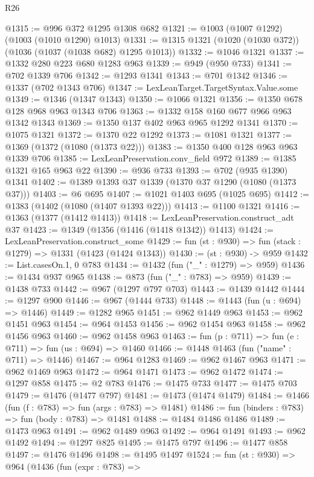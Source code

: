 \begin{lexlean}{R26}
\begin{coremodule}
@1315 := @996 @372 @1295 @1308 @682
@1321 := @1003 (@1007 @1292) (@1003 (@1010 @1290) @1013)
@1331 := @1315 @1321 (@1020 (@1030 @372)) (@1036 (@1037 (@1038 @682) @1295 @1013))
@1332 := @1046 @1321
@1337 := @1332 @280 @223 @680 @1283 @963
@1339 := @949 (@950 @733)
@1341 := @702 @1339 @706
@1342 := @1293 @1341
@1343 := @701 @1342
@1346 := @1337 (@702 @1343 @706)
@1347 := LexLeanTarget.TargetSyntax.Value.some
@1349 := @1346 (@1347 @1343)
@1350 := @1066 @1321
@1356 := @1350 @678 @128 @968 @963 @1343 @706
@1363 := @1332 @158 @160 @677 @966 @963 @1342 @1343
@1369 := @1350 @137 @402 @963 @965 @1292 @1341
@1370 := @1075 @1321
@1372 := @1370 @22 @1292
@1373 := @1081 @1321
@1377 := @1369 (@1372 (@1080 (@1373 @22)))
@1383 := @1350 @400 @128 @963 @963 @1339 @706
@1385 := LexLeanPreservation.conv_field @972
@1389 := @1385 @1321 @165 @963 @22
@1390 := @936 @733
@1393 := @702 (@935 @1390) @1341
@1402 := @1389 @1393 @37 @1339 (@1370 @37 @1290 (@1080 (@1373 @37)))
@1403 := @6 @695
@1407 := @1021 @1403 @695 (@1025 @695)
@1412 := @1383 (@1402 (@1080 (@1407 @1393 @22)))
@1413 := @1100 @1321
@1416 := @1363 (@1377 (@1412 @1413))
@1418 := LexLeanPreservation.construct_adt @37
@1423 := @1349 (@1356 (@1416 (@1418 @1342)) @1413)
@1424 := LexLeanPreservation.construct_some
@1429 := fun (st : @930) => fun (stack : @1279) => @1331 (@1423 (@1424 @1343))
@1430 := (st : @930) -> @959
@1432 := List.casesOn.{1, 0} @783
@1434 := @1432 (fun ("_" : @1279) => @959)
@1436 := @1434 @937 @965
@1438 := @873 (fun ("_" : @783) => @959)
@1439 := @1438 @733
@1442 := @967 (@1297 @797 @703)
@1443 := @1439 @1442
@1444 := @1297 @900
@1446 := @967 (@1444 @733)
@1448 := @1443 (fun (u : @694) => @1446)
@1449 := @1282 @965
@1451 := @962 @1449 @963
@1453 := @962 @1451 @963
@1454 := @964 @1453
@1456 := @962 @1454 @963
@1458 := @962 @1456 @963
@1460 := @962 @1458 @963
@1463 := fun (p : @711) => fun (e : @711) => fun (us : @694) => @1460
@1466 := @1448 @1463 (fun ("name" : @711) => @1446)
@1467 := @964 @1283
@1469 := @962 @1467 @963
@1471 := @962 @1469 @963
@1472 := @964 @1471
@1473 := @962 @1472
@1474 := @1297 @858
@1475 := @2 @783
@1476 := @1475 @733
@1477 := @1475 @703
@1479 := @1476 (@1477 @797)
@1481 := @1473 (@1474 @1479)
@1484 := @1466 (fun (f : @783) => fun (args : @783) => @1481)
@1486 := fun (binders : @783) => fun (body : @783) => @1481
@1488 := @1484 @1486 @1486
@1489 := @1473 @963
@1491 := @962 @1489 @963
@1492 := @964 @1491
@1493 := @962 @1492
@1494 := @1297 @825
@1495 := @1475 @797
@1496 := @1477 @858
@1497 := @1476 @1496
@1498 := @1495 @1497
@1524 := fun (st : @930) =>
  @964
    (@1436
      (fun (expr : @783) =>

\end{coremodule}
\end{lexlean}
